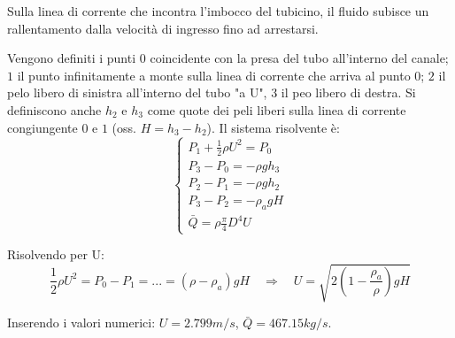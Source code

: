 Sulla linea di corrente che incontra l'imbocco del tubicino, il fluido subisce un rallentamento dalla velocità di ingresso fino ad arrestarsi.

Vengono definiti i punti $0$ coincidente con la presa del tubo all'interno del canale; $1$ il punto infinitamente a monte sulla linea di corrente che arriva al punto $0$; $2$ il pelo libero di sinistra all'interno del tubo "a U", $3$ il peo libero di destra. Si definiscono anche $h_2$ e $h_3$ come quote dei peli liberi sulla linea di corrente congiungente $0$ e $1$ (oss. $H = h_3 - h_2$).
Il sistema risolvente è:
\begin{equation}
\begin{cases}
  P_1 + \frac{1}{2} \rho U^2 = P_0 \\
  P_3 - P_0 = -\rho g h_3 \\
  P_2 - P_1 = -\rho g h_2 \\
  P_3 - P_2 = -\rho_a g H \\
  \bar{Q} = \rho \frac{\pi}{4}D^4 U
\end{cases}
\end{equation}

Risolvendo per U:
\begin{equation}
  \frac{1}{2} \rho U^2 = P_0 - P_1 = ... = (\rho - \rho_a) g H \quad \Rightarrow \quad 
  U = \sqrt{2\displaystyle\left(1-\frac{\rho_a}{\rho}\right) g H}
\end{equation}

Inserendo i valori numerici: $U = 2.799 m/s$, $\bar{Q} = 467.15 kg/s$.


